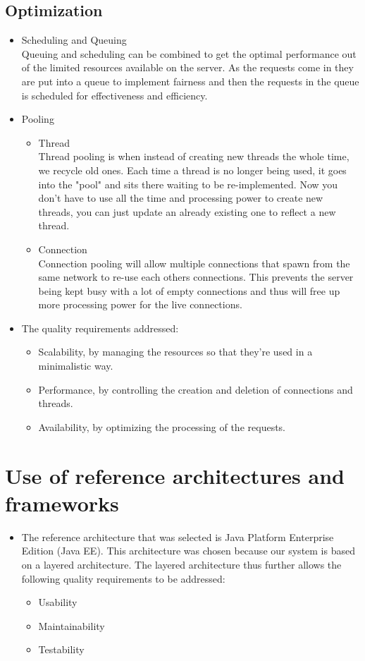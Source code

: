 \documentclass[12pt, oneside]{article}
\begin{document}
	\subsection{Optimization}
		\begin{itemize}
			\item Scheduling and Queuing\\
			Queuing and scheduling can be combined to get the optimal performance out of the limited resources available on the server. As the requests come in they are put into a queue to implement fairness and then the requests in the queue is scheduled for effectiveness and efficiency.
			\item Pooling\\
				\begin{itemize}
					\item Thread\\
					Thread pooling is when instead of creating new threads the whole time, we recycle old ones. Each time a thread is no longer being used, it goes into the "pool" and sits there waiting to be re-implemented. Now you don't have to use all the time and processing power to create new threads, you can just update an already existing one to reflect a new thread.
					\item Connection\\
					Connection pooling will allow multiple connections that spawn from the same network to re-use each others connections. This prevents the server being kept busy with a lot of empty connections and thus will free up more processing power for the live connections.
				\end{itemize}
			\item The quality requirements addressed:
			\begin{itemize}
				\item Scalability, by managing the resources so that they're used in a minimalistic way.
				\item Performance, by controlling the creation and deletion of connections and threads.
				\item Availability, by optimizing the processing of the requests.
			\end{itemize}
		\end{itemize}

\section{Use of reference architectures and frameworks}
	\begin{itemize}
		\item The reference architecture that was selected is Java Platform Enterprise Edition (Java EE). This architecture was chosen because our system is based on a layered architecture. The layered architecture thus further allows the following quality requirements to be addressed:
		\begin{itemize}
			\item Usability
			\item Maintainability
			\item Testability
		\end{itemize}		 
	\end{itemize}
			
\end{document}

